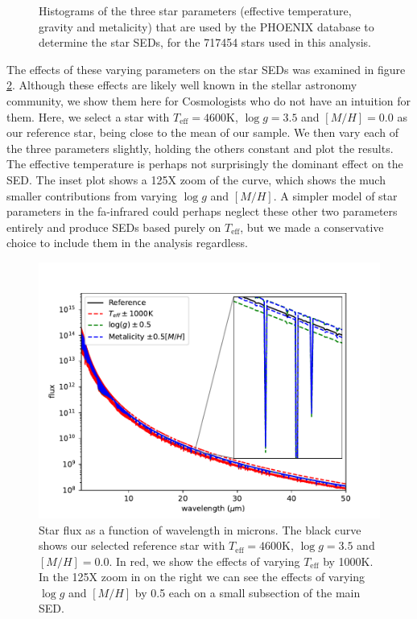 \documentclass{aa}
\begin{document}
\begin{figure}
  \caption{Histograms of the three star parameters (effective temperature, gravity and metalicity) that are used by the PHOENIX database to determine the star SEDs, for the 717454 stars used in this analysis.}
  \label{fig:gaiacat}
\end{figure}

The effects of these varying parameters on the star SEDs was examined in figure \ref{fig:catalogueSEDs}. Although these effects are likely well known in the stellar astronomy community, we show them here for Cosmologists who do not have an intuition for them. Here, we select a star with $T_{\mathrm{eff}}= 4600$K, $\log g = 3.5$ and $[M/H]= 0.0$ as our reference star, being close to the mean of our sample. We then vary each of the three parameters slightly, holding the others constant and plot the results. The effective temperature is perhaps not surprisingly the dominant effect on the SED. The inset plot shows a 125X zoom of the curve, which shows the much smaller contributions from varying $\log g$ and $[M/H]$. A simpler model of star parameters in the fa-infrared could perhaps neglect these other two parameters entirely and produce SEDs based purely on $T_{\mathrm{eff}}$, but we made a conservative choice to include them in the analysis regardless. 

\begin{figure}
\includegraphics[width=\columnwidth]{figs/gaia/star_cat.pdf}
  \caption{Star flux as a function of wavelength in microns. The black curve shows our selected reference star with $T_{\mathrm{eff}}= 4600$K, $\log g = 3.5$ and $[M/H]= 0.0$. In red, we show the effects of varying $T_{\mathrm{eff}}$ by 1000K. In the 125X zoom in on the right we can see the effects of varying $\log g$ and $[M/H]$ by 0.5 each on a small subsection of the main SED.}
  \label{fig:catalogueSEDs}
\end{figure}
\end{document}
